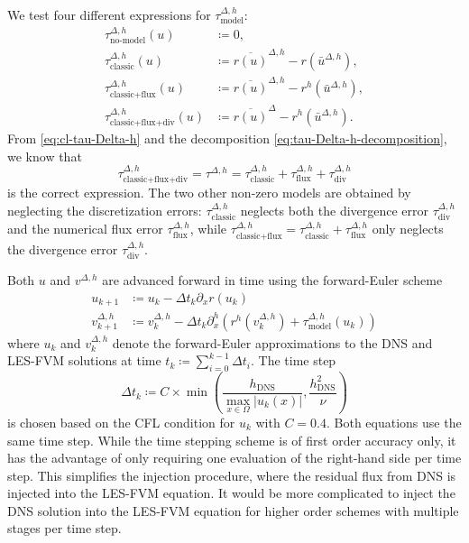 \documentclass[preprint,twocolumn,5p]{elsarticle}
\begin{document}
We test four different expressions for $\tau^{\Delta, h}_\text{model}$:
\begin{align}
    \tau^{\Delta, h}_\text{no-model}(u)
    & \coloneq 0, \\
    \tau^{\Delta, h}_\text{classic}(u)
    & \coloneq
    \overline{r(u)}^{\Delta, h} - r(\bar{u}^{\Delta, h}), \\
    \tau^{\Delta, h}_\text{classic+flux}(u)
    & \coloneq
    \overline{r(u)}^{\Delta, h} - r^h(\bar{u}^{\Delta, h}), \\
    \tau^{\Delta, h}_\text{classic+flux+div}(u)
    & \coloneq
    \overline{r(u)}^\Delta - r^h(\bar{u}^{\Delta, h}).
\end{align}
From \cref{eq:cl-tau-Delta-h} and
the decomposition \eqref{eq:tau-Delta-h-decomposition},
we know that
\begin{equation}
    \tau^{\Delta, h}_\text{classic+flux+div} =
    \tau^{\Delta, h} =
    \tau^{\Delta, h}_\text{classic} +
    \tau^{\Delta, h}_\text{flux} +
    \tau^{\Delta, h}_\text{div}
\end{equation}
is the correct expression.
The two other non-zero models are obtained by neglecting the
discretization errors:
$\tau^{\Delta, h}_\text{classic}$ neglects both the divergence error
$\tau^{\Delta, h}_\text{div}$
and the
numerical flux error
$\tau^{\Delta, h}_\text{flux}$,
while $\tau^{\Delta, h}_\text{classic+flux} =
\tau^{\Delta, h}_\text{classic} + \tau^{\Delta, h}_\text{flux}$ only neglects
the divergence error $\tau^{\Delta, h}_\text{div}$.


Both $u$ and $v^{\Delta, h}$ are advanced forward in time using the
forward-Euler scheme
\begin{align}
    u_{k + 1} & \coloneq u_k - \Delta t_k \partial_x r(u_k) \\
    v^{\Delta, h}_{k + 1} & \coloneq v^{\Delta, h}_k -
    \Delta t_k \partial^h_x \left( r^h(v^{\Delta, h}_k) + \tau^{\Delta, h}_\text{model}(u_k) \right)
\end{align}
where $u_k$ and $v^{\Delta, h}_k$ denote the forward-Euler approximations
to the DNS and LES-FVM solutions at time
$t_k \coloneq \sum_{i = 0}^{k - 1} \Delta t_i$.
The time step
\begin{equation}
    \Delta t_k \coloneq C \times \min \left( \frac{h_\text{DNS}}{\max_{x \in \Omega} | u_k(x) | }, \frac{h_\text{DNS}^2}{\nu} \right)
\end{equation}
is chosen based on the CFL condition for $u_k$ with $C = 0.4$. Both equations
use the same time step. While the time stepping scheme is of first order
accuracy only, it has the advantage of only requiring one evaluation of the
right-hand side per time step. This simplifies the injection procedure, where
the residual flux from DNS is injected into the LES-FVM equation. It
would be more complicated to inject the DNS solution into the LES-FVM
equation for higher order schemes with multiple stages per time step.
\end{document}
